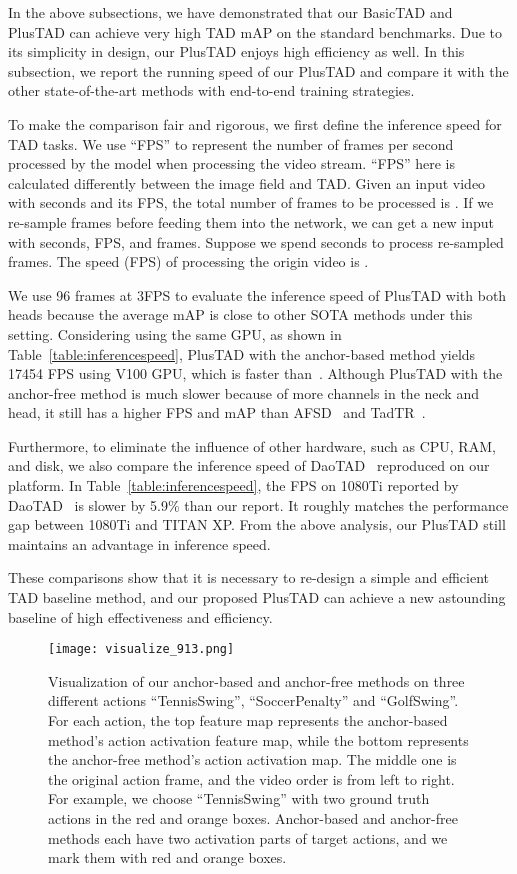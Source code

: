 \documentclass[a4paper,fleqn]{cas-dc}
\begin{document}
In the above subsections, we have demonstrated that our BasicTAD and PlusTAD can achieve very high TAD mAP on the standard benchmarks. Due to its simplicity in design, our PlusTAD enjoys high efficiency as well. In this subsection, we report the running speed of our PlusTAD and compare it with the other state-of-the-art methods with end-to-end training strategies.

To make the comparison fair and rigorous, we first define the inference speed for TAD tasks. 
We use ``FPS'' to represent the number of frames per second processed by the model when processing the video stream. 
``FPS'' here is calculated differently between the image field and TAD. Given an input video with  seconds and its  FPS, the total number of frames to be processed is . If we re-sample frames before feeding them into the network, we can get a new input with  seconds,  FPS, and  frames. Suppose we spend  seconds to process re-sampled frames. The speed (FPS) of processing the origin video is .

We use 96 frames at 3FPS to evaluate the inference speed of PlusTAD with both heads because the average mAP is close to other SOTA methods under this setting. Considering using the same GPU, as shown in Table~\ref{table:inferencespeed}, PlusTAD with the anchor-based method yields 17454 FPS using V100 GPU, which is  faster than~\citep{afsd}. 
Although PlusTAD with the anchor-free method is much slower because of more channels in the neck and head, it still has a higher FPS and mAP than AFSD~\citep{afsd} and TadTR~\citep{e2e-TADTR}. 

Furthermore, to eliminate the influence of other hardware, such as CPU, RAM, and disk, we also compare the inference speed of DaoTAD~\citep{rgb_enough} reproduced on our platform. In Table~\ref{table:inferencespeed}, the FPS on 1080Ti reported by DaoTAD~\citep{rgb_enough} is slower by 5.9\% than our report. It roughly matches the performance gap between 1080Ti and TITAN XP. From the above analysis, our PlusTAD still maintains an advantage in inference speed.

These comparisons show that it is necessary to re-design a simple and efficient TAD baseline method, and our proposed PlusTAD can achieve a new astounding baseline of high effectiveness and efficiency.


\begin{figure*}[!t]
  \texttt{[image: visualize\_913.png]}
  \caption{Visualization of our anchor-based and anchor-free methods on three different actions ``TennisSwing'', ``SoccerPenalty'' and ``GolfSwing''. For each action, the top feature map represents the anchor-based method's action activation feature map, while the bottom represents the anchor-free method's action activation map. The middle one is the original action frame, and the video order is from left to right. For example, we choose ``TennisSwing'' with two ground truth actions in the red and orange boxes. Anchor-based and anchor-free methods each have two activation parts of target actions, and we mark them with red and orange boxes.
}
  \label{fig:crop}
\end{figure*}
\end{document}
